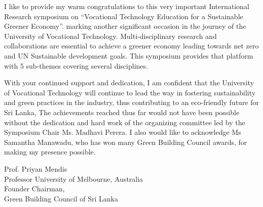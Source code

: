 \thispagestyle{fancy}
	




   
    



	
	I like to provide my warm congratulations to this very important International Research symposium on “Vocational Technology Education for a Sustainable Greener Economy”. marking another significant occasion in the journey of the University of Vocational Technology. Multi-disciplinary research and collaborations are essential to achieve a greener economy leading towards net zero and UN Sustainable development goals. This symposium provides that platform with 5 sub-themes covering several disciplines.
 
With your continued support and dedication, I am confident that the University of Vocational Technology will continue to lead the way in fostering sustainability and green practices in the industry, thus contributing to an eco-friendly future for Sri Lanka,
The achievements reached thus far would not have been possible without the dedication and hard work of the organizing committee led by the Symposium Chair Ms. Madhavi Perera. I also would like to acknowledge Ms Samantha Manawadu, who has won many Green Building Council awards,  for making my presence possible.
	
	\vspace{1cm}
	\noindent
	Prof. Priyan Mendis \\
Professor University of Melbourne, Australia \\
Founder Chairman,\\
Green Building Council of Sri Lanka
	
	\newpage
	